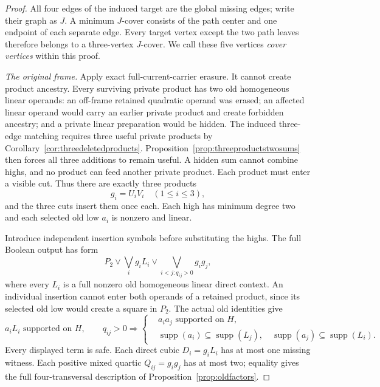 \documentclass[11pt]{article}
\newcommand{\supp}{\operatorname{supp}}
\theoremstyle{definition}
\theoremstyle{remark}
\begin{document}
\begin{proof}
All four edges of the induced target are the global missing edges; write their graph as $J$. A minimum $J$-cover consists of the path center and one endpoint of each separate edge. Every target vertex except the two path leaves therefore belongs to a three-vertex $J$-cover. We call these five vertices \emph{cover vertices} within this proof.

\emph{The original frame.} Apply exact full-current-carrier erasure. It cannot create product ancestry. Every surviving private product has two old homogeneous linear operands: an off-frame retained quadratic operand was erased; an affected linear operand would carry an earlier private product and create forbidden ancestry; and a private linear preparation would be hidden. The induced three-edge matching requires three useful private products by Corollary~\ref{cor:threedeletedproducts}. Proposition~\ref{prop:threeproductstwosums} then forces all three additions to remain useful. A hidden sum cannot combine highs, and no product can feed another private product. Each product must enter a visible cut. Thus there are exactly three products
\[
g_i=U_iV_i\quad(1\le i\le3),
\]
and the three cuts insert them once each. Each high has minimum degree two and each selected old low $a_i$ is nonzero and linear.

Introduce independent insertion symbols before substituting the highs. The full Boolean output has form
\[
P_2\vee\bigvee_i g_iL_i\vee
       \bigvee_{i<j:q_{ij}>0}g_ig_j,
\]
where every $L_i$ is a full nonzero old homogeneous linear direct context. An individual insertion cannot enter both operands of a retained product, since its selected old low would create a square in $P_2$. The actual old identities give
\[
a_iL_i\text{ supported on }H,
\qquad q_{ij}>0\Longrightarrow
\left\{
\begin{aligned}
&a_ia_j\text{ supported on }H,\\
&\supp(a_i)\subseteq\supp(L_j),\quad
  \supp(a_j)\subseteq\supp(L_i).
\end{aligned}\right.
\tag{*}
\]
Every displayed term is safe. Each direct cubic $D_i=g_iL_i$ has at most one missing witness. Each positive mixed quartic $Q_{ij}=g_ig_j$ has at most two; equality gives the full four-transversal description of Proposition~\ref{prop:oldfactors}.


\end{proof}
\end{document}
